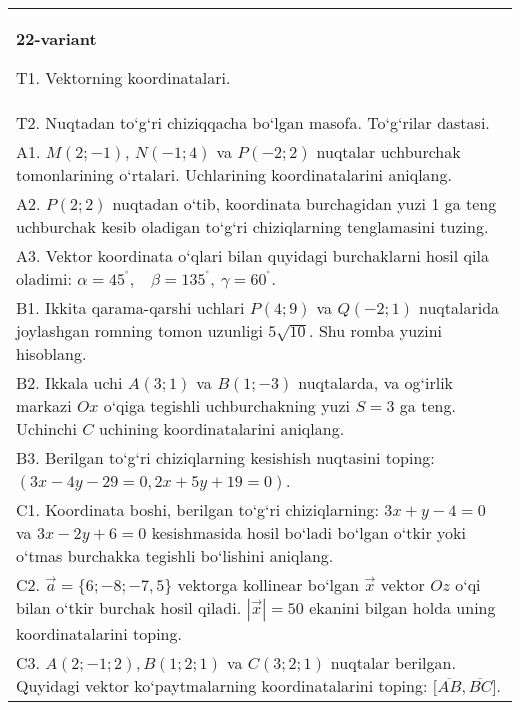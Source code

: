\documentclass{article}
\begin{document}
\begin{tabular}{m{17cm}}
\textbf{22-variant}

T1. 
Vektorning koordinatalari.
 \\
T2. 
Nuqtadan to‘g‘ri chiziqqacha bo‘lgan masofa. To‘g‘rilar dastasi.
 \\
A1. 
$M (2;-1) $, $N (-1;4) $ va $P (-2;2) $ nuqtalar
uchburchak tomonlarining o‘rtalari. Uchlarining koordinatalarini
aniqlang.
 \\
A2. 
$P (2;2)$ nuqtadan o‘tib, koordinata burchagidan
yuzi 1 ga teng uchburchak kesib oladigan to‘g‘ri chiziqlarning
tenglamasini tuzing.
 \\
A3. 
Vektor koordinata o‘qlari bilan quyidagi burchaklarni hosil qila oladimi:
$\alpha = 45^{{^\circ}},\ \ \ \ \beta = 135^{{^\circ}},\ \gamma = 60^{{^\circ}}$.
 \\
B1. 
Ikkita qarama-qarshi uchlari \(P (4;9) \) va \(Q (-2; 1) \) nuqtalarida joylashgan romning tomon uzunligi \(5\sqrt{10}\). Shu
romba yuzini hisoblang.
 \\
B2. 
Ikkala uchi \(A (3;1) \) va \(B (1;-3) \) nuqtalarda, va
og‘irlik markazi $Ox$ o‘qiga tegishli uchburchakning yuzi
\(S=3\) ga teng. Uchinchi $C$ uchining koordinatalarini aniqlang.
 \\
B3. 
Berilgan to‘g‘ri chiziqlarning kesishish nuqtasini toping:
$(3x-4y-29=0, 2x+5y+19=0)$.
 \\
C1. 
Koordinata boshi, berilgan to‘g‘ri chiziqlarning:
\(3x+y-4=0\) va \(3x-2y+6=0\) kesishmasida hosil bo‘ladi
bo‘lgan o‘tkir yoki o‘tmas burchakka tegishli bo‘lishini aniqlang.
 \\
C2. 
$\vec{a} = \{ 6; - 8; - 7,5\}$ vektorga kollinear bo‘lgan $\vec{x}$ vektor $Oz$ o‘qi bilan o‘tkir burchak hosil qiladi. $|\vec{x}| = 50$ ekanini bilgan holda uning koordinatalarini toping.
 \\
C3. 
$A (2; -1;2),B (1;2; 1) $ va $C (3;2;1)$ nuqtalar berilgan. Quyidagi vektor ko‘paytmalarning koordinatalarini toping:
$\lbrack\overline{AB},\overline{BC}\rbrack$.
 \\

\end{tabular}
\vspace{1cm}
\end{document}
